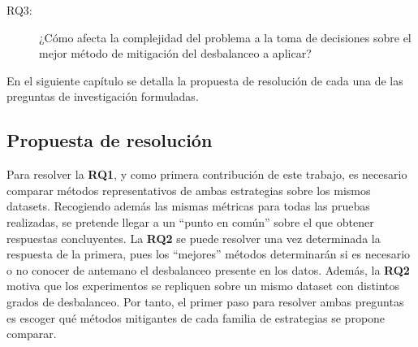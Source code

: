 \begin{description}    
    \item[RQ3:] ¿Cómo afecta la complejidad del problema a la toma de decisiones sobre el mejor método de mitigación del desbalanceo a aplicar?
\end{description}

En el siguiente capítulo se detalla la propuesta de resolución de cada una de las preguntas de investigación formuladas.

\iffalse
\subsection{Propuesta de resolución\label{SUBSEC:PROPOSAL}}

Para resolver la \textbf{RQ1}, y como primera contribución de este trabajo, es necesario comparar métodos representativos de ambas estrategias sobre los mismos datasets. Recogiendo además las mismas métricas para todas las pruebas realizadas, se pretende llegar a un ``punto en común'' sobre el que obtener respuestas concluyentes. La \textbf{RQ2} se puede resolver una vez determinada la respuesta de la primera, pues los ``mejores'' métodos determinarán si es necesario o no conocer de antemano el desbalanceo presente en los datos. Además, la \textbf{RQ2} motiva que los experimentos se repliquen sobre un mismo dataset con distintos grados de desbalanceo. Por tanto, el primer paso para resolver ambas preguntas es escoger qué métodos mitigantes de cada familia de estrategias se propone comparar.

